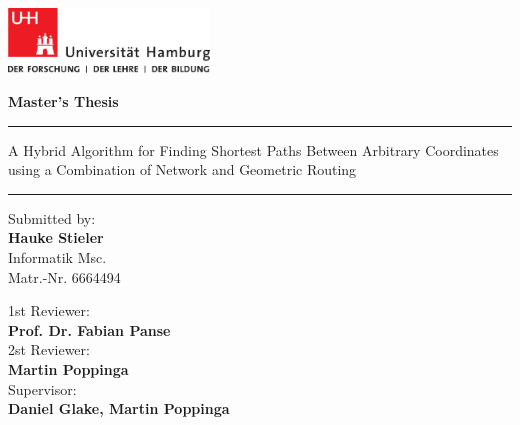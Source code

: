 

\begin{titlepage}
	
	\includegraphics[width=0.4\textwidth]{images/UHH-Logo_2010_Farbe_CMYK.pdf}
	\vspace{1cm}
	
	\begin{center}
		
		{
			\Large
			\textbf{Master's Thesis}
			\par
		}
		
		\vspace{1.5cm}
		\hrule
		\vspace{1cm}
		
		{
			\titlefont
			\huge
			A Hybrid Algorithm for Finding Shortest Paths Between Arbitrary Coordinates using a Combination of Network and Geometric Routing
			\par
		}
		
		\vspace{1cm}
		\hrule
		\vspace{1.5cm}
	\end{center}
	
	\begin{multicols}{2}
		\raggedright
		Submitted by:\\
		\textbf{Hauke Stieler}\\Informatik Msc.\\Matr.-Nr. 6664494
		
		\columnbreak
		\raggedleft
		
		1st Reviewer:\\
		\textbf{Prof. Dr. Fabian Panse}\\
		\vspace{0.25cm}
		2st Reviewer:\\
		\textbf{Martin Poppinga}\\
		\vspace{0.25cm}
		Supervisor:\\
		\textbf{Daniel Glake, Martin Poppinga}
	\end{multicols}


\end{titlepage}
